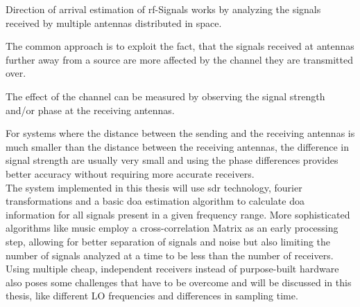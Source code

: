 Direction of arrival estimation of \acrshort{rf}-Signals
works by analyzing the signals received by
multiple antennas distributed in space.

The common approach is to exploit the fact,
that the signals received at antennas further
away from a source are more affected by the channel
they are transmitted over.

The effect of the channel can be measured by
observing the signal strength and/or phase
at the receiving antennas.

For systems where the distance between
the sending and the receiving antennas is much
smaller than the distance between the receiving
antennas, the difference in signal strength
are usually very small and using the phase
differences provides better accuracy without
requiring more accurate receivers. \\

The system implemented in this thesis will use \gls{sdr}
technology, fourier transformations and a basic \acrlong{doa}
estimation algorithm to calculate \gls{doa}
information for all signals present in a given frequency range.
More sophisticated algorithms like \acrshort{music} employ
a cross-correlation Matrix as an early processing step,
allowing for better separation of signals and noise
but also limiting the number of signals analyzed at
a time to be less than the number of receivers. \\

Using multiple cheap, independent receivers instead
of purpose-built hardware also poses some challenges
that have to be overcome and will be discussed in
this thesis, like different LO frequencies and differences
in sampling time.

